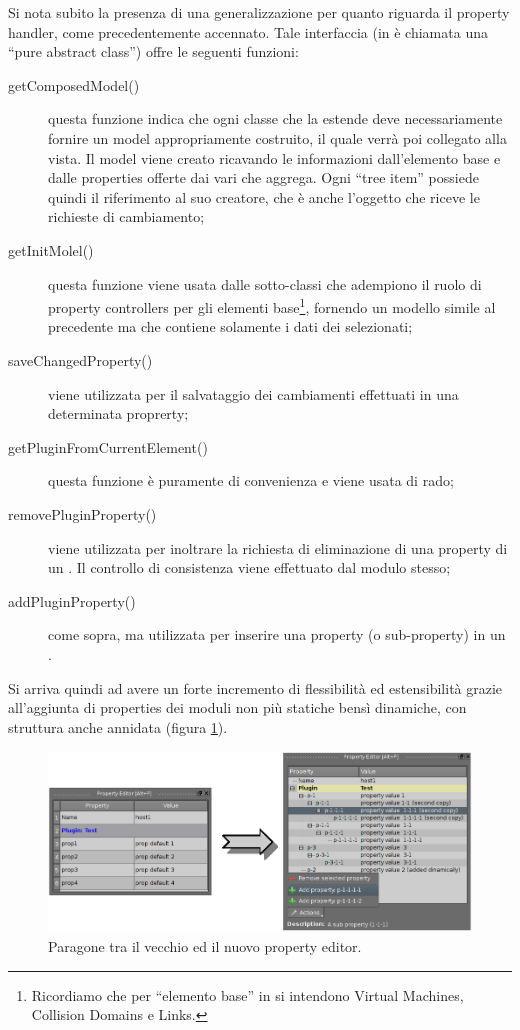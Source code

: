 Si nota subito la presenza di una generalizzazione per quanto riguarda il property handler, come precedentemente accennato. Tale interfaccia (in \cpp{} è chiamata una ``pure abstract class'') offre le seguenti funzioni:
\begin{description}
\item[getComposedModel()]questa funzione indica che ogni classe che la estende deve necessariamente fornire un model appropriamente costruito, il quale verrà poi collegato alla vista. Il model viene creato ricavando le informazioni dall'elemento base e dalle properties offerte dai vari \plugin{} che aggrega. Ogni ``tree item'' possiede quindi il riferimento al suo creatore, che è anche l'oggetto che riceve le richieste di cambiamento;

\item[getInitMolel()]questa funzione viene usata dalle sotto-classi che adempiono il ruolo di property controllers per gli elementi base\footnote{Ricordiamo che per ``elemento base'' in \visualnetkit{} si intendono Virtual Machines, Collision Domains e Links.}, fornendo un modello simile al precedente ma che contiene solamente i dati dei \plugin{} selezionati;

\item[saveChangedProperty()]viene utilizzata per il salvataggio dei cambiamenti effettuati in una determinata proprerty;

\item[getPluginFromCurrentElement()]questa funzione è puramente di convenienza e viene usata di rado;

\item[removePluginProperty()]viene utilizzata per inoltrare la richiesta di eliminazione di una property di un \plugin{}. Il controllo di consistenza viene effettuato dal modulo stesso;

\item[addPluginProperty()]come sopra, ma utilizzata per inserire una property (o sub-property) in un \plugin{}.
\end{description}

Si arriva quindi ad avere un forte incremento di flessibilità ed estensibilità grazie all'aggiunta di properties dei moduli non più statiche bensì dinamiche, con struttura anche annidata (figura \ref{figura:property_editor_paragone}).

\begin{figure}[!htb]
	\centering
	\includegraphics[width=12cm]{images/property_editors_paragone.png}
	\caption{Paragone tra il vecchio ed il nuovo property editor.}
	\label{figura:property_editor_paragone}
\end{figure}


